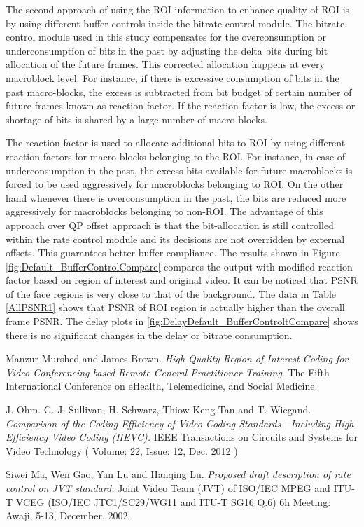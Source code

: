\documentclass[11pt]{article} %
\begin{document}
The second approach of using the ROI information to enhance quality of ROI is by using different buffer controls inside the bitrate control module. The bitrate control module used in this study compensates for the overconsumption or underconsumption of bits in the past by adjusting the delta bits during bit allocation of the future frames. This corrected allocation happens at every macroblock level. For instance, if there is excessive consumption of bits in the past macro-blocks, the excess is subtracted from bit budget of certain number of future frames known as reaction factor. If the reaction factor is low, the excess or shortage of bits is shared by a large number of macro-blocks.

The reaction factor is used to allocate additional bits to ROI by using different reaction factors for macro-blocks belonging to the ROI. For instance, in case of underconsumption in the past, the excess bits available for future macroblocks is forced to be used aggressively for macroblocks belonging to ROI. On the other hand whenever there is overconsumption in the past, the bits are reduced more aggressively for macroblocks belonging to non-ROI. The advantage of this approach over QP offset approach is that the bit-allocation is still controlled within the rate control module and its decisions are not overridden by external offsets. This guarantees better buffer compliance. The results shown in Figure \ref{fig:Default_BufferControlCompare} compares the output with modified reaction factor based on region of interest and original video. It can be noticed that PSNR of the face regions is very close to that of the background. The data in Table \ref{AllPSNR1} shows that PSNR of ROI region is actually higher than the overall frame PSNR. The delay plots in \ref{fig:DelayDefault_BufferControltCompare} shows there is no significant changes in the delay or bitrate consumption.
%
%
%
%
%
\clearpage
\begin{thebibliography}{9}
Manzur Murshed and James Brown. 
\textit{High Quality Region-of-Interest Coding for Video Conferencing based Remote General Practitioner Training}. 
The Fifth International Conference on eHealth, Telemedicine, and Social Medicine.

J. Ohm. G. J. Sullivan, H. Schwarz, Thiow Keng Tan and T. Wiegand.
\textit{Comparison of the Coding Efficiency of Video Coding Standards—Including High Efficiency Video Coding (HEVC).}
 IEEE Transactions on Circuits and Systems for Video Technology ( Volume: 22, Issue: 12, Dec. 2012 )

Siwei Ma, Wen Gao, Yan Lu and Hanqing Lu.
\textit{Proposed draft description of rate control on JVT standard. }
Joint Video Team (JVT) of ISO/IEC MPEG and ITU-T VCEG (ISO/IEC JTC1/SC29/WG11 and ITU-T SG16 Q.6) 6h Meeting: Awaji, 5-13, December, 2002.

\end{thebibliography}
\end{document}
